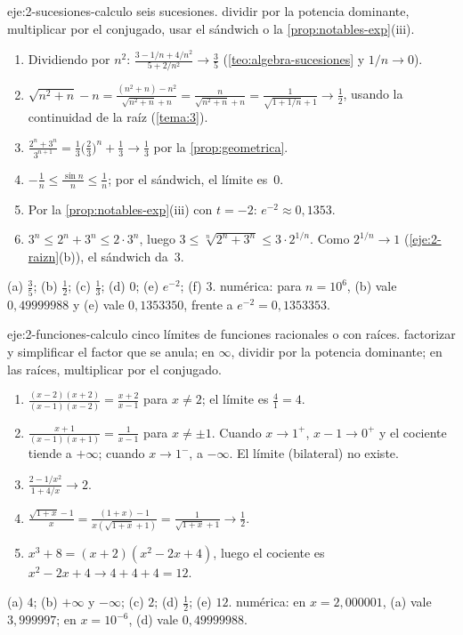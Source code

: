 \begin{solucion}{eje:2-sucesiones-calculo}
\datos seis sucesiones.
\planteamiento dividir por la potencia dominante, multiplicar por el conjugado, usar el sándwich o la \cref{prop:notables-exp}(iii).
\pasos
\begin{enumerate}[label=(\alph*)]
  \item Dividiendo por $n^{2}$: $\frac{3-1/n+4/n^{2}}{5+2/n^{2}}\to\frac35$ (\cref{teo:algebra-sucesiones} y $1/n\to0$).
  \item $\sqrt{n^{2}+n}-n=\frac{(n^{2}+n)-n^{2}}{\sqrt{n^{2}+n}+n}=\frac{n}{\sqrt{n^{2}+n}+n}=\frac{1}{\sqrt{1+1/n}+1}\to\frac12$, usando la continuidad de la raíz (\cref{tema:3}).
  \item $\frac{2^{n}+3^{n}}{3^{n+1}}=\frac13\bigl(\frac23\bigr)^{n}+\frac13\to\frac13$ por la \cref{prop:geometrica}.
  \item $-\frac1n\le\frac{\sin n}{n}\le\frac1n$; por el sándwich, el límite es~0.
  \item Por la \cref{prop:notables-exp}(iii) con $t=-2$: $e^{-2}\approx0{,}1353$.
  \item $3^{n}\le2^{n}+3^{n}\le2\cdot3^{n}$, luego $3\le\sqrt[n]{2^{n}+3^{n}}\le3\cdot2^{1/n}$. Como $2^{1/n}\to1$ (\cref{eje:2-raizn}(b)), el sándwich da~3.
\end{enumerate}
\resultado (a) $\tfrac35$; (b) $\tfrac12$; (c) $\tfrac13$; (d) $0$; (e) $e^{-2}$; (f) $3$.
\comprobacion numérica: para $n=10^{6}$, (b) vale $0{,}49999988$ y (e) vale $0{,}1353350$, frente a $e^{-2}=0{,}1353353$.
\end{solucion}

\begin{solucion}{eje:2-funciones-calculo}
\datos cinco límites de funciones racionales o con raíces.
\planteamiento factorizar y simplificar el factor que se anula; en $\infty$, dividir por la potencia dominante; en las raíces, multiplicar por el conjugado.
\pasos
\begin{enumerate}[label=(\alph*)]
  \item $\frac{(x-2)(x+2)}{(x-1)(x-2)}=\frac{x+2}{x-1}$ para $x\ne2$; el límite es $\frac41=4$.
  \item $\frac{x+1}{(x-1)(x+1)}=\frac{1}{x-1}$ para $x\ne\pm1$. Cuando $x\to1^{+}$, $x-1\to0^{+}$ y el cociente tiende a $+\infty$; cuando $x\to1^{-}$, a $-\infty$. El límite (bilateral) no existe.
  \item $\frac{2-1/x^{2}}{1+4/x}\to2$.
  \item $\frac{\sqrt{1+x}-1}{x}=\frac{(1+x)-1}{x(\sqrt{1+x}+1)}=\frac{1}{\sqrt{1+x}+1}\to\frac12$.
  \item $x^{3}+8=(x+2)(x^{2}-2x+4)$, luego el cociente es $x^{2}-2x+4\to4+4+4=12$.
\end{enumerate}
\resultado (a) $4$; (b) $+\infty$ y $-\infty$; (c) $2$; (d) $\tfrac12$; (e) $12$.
\comprobacion numérica: en $x=2{,}000001$, (a) vale $3{,}999997$; en $x=10^{-6}$, (d) vale $0{,}49999988$.
\end{solucion}

